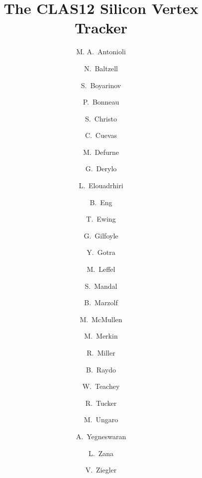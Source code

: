 \title{The CLAS12 Silicon Vertex Tracker}

\author[A]{M. A.~Antonioli}
\author[A]{N.~Baltzell}
\author[A]{S.~Boyarinov}
\author[A]{P.~Bonneau}
\author[A]{S.~Christo}
\author[A]{C.~Cuevas}
\author[B]{M.~Defurne}
\author[C]{G.~Derylo}
\author[A]{L.~Elouadrhiri}
\author[A]{B.~Eng}
\author[A]{T.~Ewing}
\author[D]{G.~Gilfoyle}
\author[A]{Y.~Gotra }
\author[A]{M.~Leffel}
\author[A]{S.~Mandal}
\author[A]{B.~Marzolf}
\author[A]{M.~McMullen}
\author[E]{M.~Merkin}
\author[A]{R.~Miller}
\author[A]{B.~Raydo}
\author[A]{W.~Teachey}
\author[F]{R.~Tucker}
\author[A]{M.~Ungaro}
\author[A]{A.~Yegneswaran}
\author[A]{L.~Zana}
\author[A]{V.~Ziegler}

\address[A]{Thomas Jefferson National Accelerator Facility, Newport News, VA 23606, USA}
\address[B]{CEA-Saclay, Universit\'e Paris-Saclay, 91191, Gif-sur-Yvette, France}
\address[C]{Fermi National Accelerator Laboratory, Batavia, IL 60510, USA}
\address[D]{University of Richmond, Richmond, VA 23173, USA}
\address[E]{Skobeltsyn Institute of Nuclear Physics, Lomonosov Moscow State University, 119234 Moscow, Russia}
\address[F]{Arizona State University, Tempe, AZ 85287, USA}
